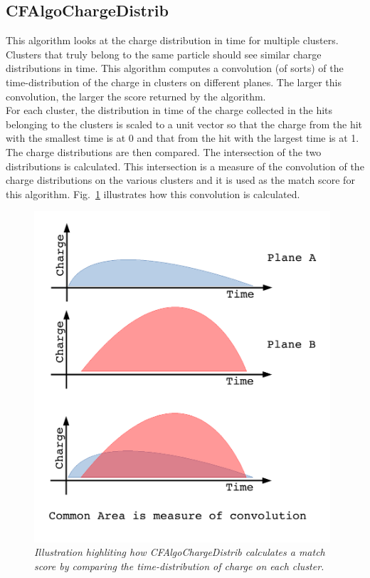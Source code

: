 \documentclass{article}
\begin{document}
\subsection{CFAlgoChargeDistrib}
This algorithm looks at the charge distribution in time for multiple clusters. Clusters that truly belong to the same particle should see similar charge
distributions in time. This algorithm computes a convolution (of sorts) of the time-distribution of the charge in clusters on different planes. The larger
this convolution, the larger the score returned by the algorithm.\\
For each cluster, the distribution in time of the charge collected in the hits belonging to the clusters is scaled to a unit vector so that the charge from
the hit with the smallest time is at 0 and that from the hit with the largest time is at 1. The charge distributions are then compared. The intersection
of the two distributions is calculated. This intersection is a measure of the convolution of the charge distributions on the various clusters and it is
used as the match score for this algorithm. Fig.~\ref{fig:ChargeDistrib} illustrates how this convolution is calculated.
\begin{figure}[!h]
\begin{center}
\includegraphics[width=110mm]{Figures/MatchAglo_CFAlgoChargeDistrib_Description.pdf}
\end{center}
\caption{\textit{Illustration highliting how CFAlgoChargeDistrib calculates a match score by comparing the time-distribution of charge on each cluster.}}
\label{fig:ChargeDistrib}
\end{figure}
\end{document}
